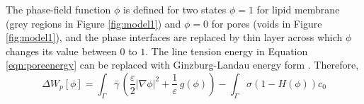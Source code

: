 \documentclass[english,12pt]{article}
\begin{document}
The phase-field function $\phi$ is defined for two states $\phi=1$ for lipid membrane (grey regions in Figure \ref{fig:model1}) and $\phi=0$ for pores (voids in Figure \ref{fig:model1}), and the phase interfaces are replaced by thin layer across which $\phi$ changes its value between $0$ to $1$. The line tension energy in Equation \ref{eqn:poreenergy} can be replaced with Ginzburg-Landau energy form \cite{elliott2010surface,du2011phase}. Therefore,
\begin{equation}
	\Delta W_p\left[\phi\right]=\int_{\Gamma}\bar{\gamma}\,\left(\frac{\varepsilon}{2}|\nabla\phi|^{2}+\frac{1}{\varepsilon}\,g\left(\phi\right) \right)-\int_{\Gamma}\sigma\left(1-H(\phi)\right)c_0
	\label{eqn:func2}
\end{equation}
\end{document}

